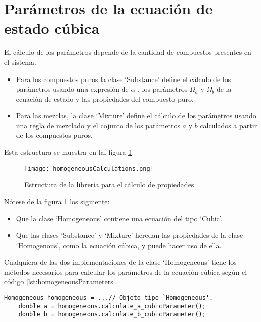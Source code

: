 \section{Parámetros de la ecuación de estado cúbica}\label{sec:parameters}

El cálculo de los parámetros depende de la cantidad de compuestos presentes en el sistema.

\begin{itemize}
 \item Para los compuestos puros la clase `Substance' define el cálculo de los parámetros usando una expresión de $\alpha$ , los parámetros $\Omega_a$ y $\Omega_b$ de la ecuación de estado y las propiedades del compuesto puro.
 \item Para las mezclas, la clase `Mixture' define el cálculo de los parámetros usando una regla de mezclado y el cojunto de los parámetros  $a$ y $b$ calculados a partir de los compuestos puros.
\end{itemize}


Esta estructura se muestra en laf figura \ref{fig:homogeneousCalculations}

\begin{figure}[!h]
  
  \centering
    \texttt{[image: homogeneousCalculations.png]}
    \caption{Estructura de la librería para el cálculo de propiedades.}
    \label{fig:homogeneousCalculations}
\end{figure}

Nótese de la figura \ref{fig:homogeneousCalculations} los siguiente:
\begin{itemize}
	\item Que la clase `Homogeneous' contiene una ecuación del tipo `Cubic'.
 	\item Que las clases `Substance' y `Mixture' heredan las propiedades de la clase `Homogenous', como la ecuación cúbica, y puede hacer uso de ella.

\end{itemize}

	Cualquiera de las dos implementaciones de la clase `Homogeneous' tiene los métodos necesarios para calcular los parámetros de la ecuación cúbica según el código \ref{lst:homogeneousParameters}.

\begin{lstlisting}[caption=Cualquier objeto tipo `Homogeneous' puede calcular los parámetros de la ecuación de estado cúbica a y b, label={lst:homogeneousParameters}]
	Homogeneous homogeneous = ...// Objeto tipo `Homogeneous'.
	double a = homogeneous.calculate_a_cubicParameter();
	double b = homogeneous.calculate_b_cubicParameter();
\end{lstlisting}


